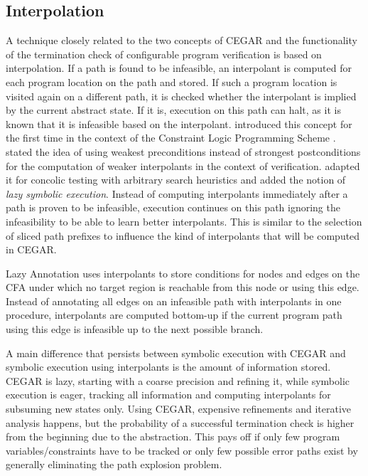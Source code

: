 \subsection*{Interpolation}
A technique closely related to the two concepts of CEGAR and the functionality of the termination check of configurable program verification is based on interpolation.
If a path is found to be infeasible, an interpolant is computed for each program location on the path and stored.
If such a program location is visited again on a different path, it is checked whether the interpolant is implied by the current abstract state.
If it is, execution on this path can halt, as it is known that it is infeasible based on the interpolant.
\cite{Jaffar2009} introduced this concept for the first time in the context of the Constraint Logic Programming Scheme \cite{Jaffar1992}.
\cite{Jaffar2012} stated the idea of using weakest preconditions instead of strongest postconditions for the computation of weaker interpolants in the context of verification.
\cite{Jaffar2013} adapted it for concolic testing with arbitrary search heuristics and
\cite{Chu2014} added the notion of \emph{lazy symbolic execution}.
Instead of computing interpolants immediately after a path is proven to be infeasible, execution continues on this path ignoring the infeasibility to be able to learn better interpolants.
This is similar to the selection of sliced path prefixes \cite{Beyer2015} to influence the kind of interpolants that will be computed in CEGAR.

Lazy Annotation \cite{McMillan2010} uses interpolants to store conditions for nodes and edges on the CFA under which no target region is reachable from this node or using this edge.
Instead of annotating all edges on an infeasible path with interpolants in one procedure, interpolants are computed bottom-up if the current program path using this edge is infeasible up to the next possible branch.

A main difference that persists between symbolic execution with CEGAR and symbolic execution using interpolants is the amount of information stored.
CEGAR is lazy, starting with a coarse precision and refining it, while symbolic execution is eager,
tracking all information and computing interpolants for subsuming new states only.
Using CEGAR, expensive refinements and iterative analysis happens,
but the probability of a successful termination check is higher from the beginning due to the abstraction.
This pays off if only few program variables/constraints have to be tracked or only few possible error paths exist
by generally eliminating the path explosion problem.


